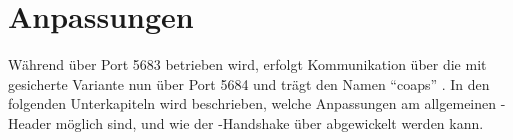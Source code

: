 \chapter{Anpassungen}
\label{chp:anpassungen}

Während  über Port 5683 betrieben wird, erfolgt Kommunikation über die mit  gesicherte Variante nun
über Port 5684 und trägt den Namen "`coaps"' \cite{portnumbers}. In den folgenden Unterkapiteln wird beschrieben, welche
Anpassungen am allgemeinen -Header möglich sind, und wie der -Handshake über  abgewickelt
werden kann.


